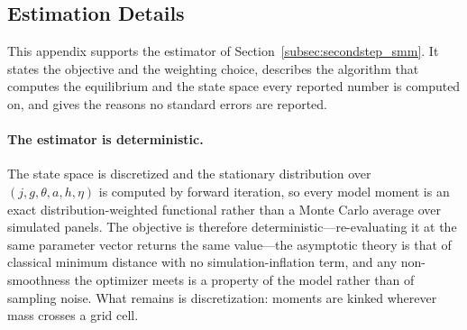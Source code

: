 \documentclass[12pt,a4paper]{article}
\begin{document}
\begin{appendices}
\section{Estimation Details}
\label{app:estimation}

This appendix supports the estimator of Section~\ref{subsec:secondstep_smm}. It states the objective and the weighting choice, describes the algorithm that computes the equilibrium and the state space every reported number is computed on, and gives the reasons no standard errors are reported.

\paragraph{The estimator is deterministic.} The state space is discretized and the stationary distribution over $(j,g,\theta,a,h,\eta)$ is computed by forward iteration, so every model moment is an exact distribution-weighted functional rather than a Monte Carlo average over simulated panels. The objective is therefore deterministic---re-evaluating it at the same parameter vector returns the same value---the asymptotic theory is that of classical minimum distance with no simulation-inflation term, and any non-smoothness the optimizer meets is a property of the model rather than of sampling noise. What remains is discretization: moments are kinked wherever mass crosses a grid cell.


\end{appendices}
\end{document}
